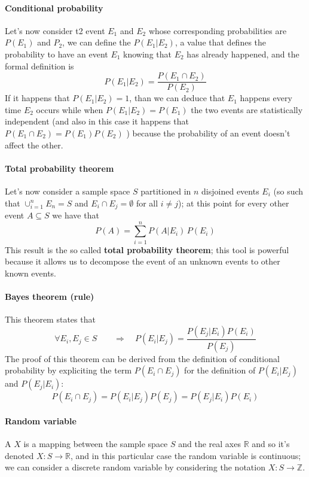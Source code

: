 	\paragraph{Conditional probability} Let's now consider t2 event $E_1$ and $E_2$ whose corresponding probabilities are $P(E_1)$ and $P_2$, we can define the  $P(E_1|E_2)$, a value that defines the probability to have an event $E_1$ knowing that $E_2$ has already happened, and the formal definition is
	\begin{equation}
		P(E_1|E_2) = \frac{P(E_1\cap E_2)}{P(E_2)}
	\end{equation}
	If it happens that $P(E_1|E_2) = 1$, than we can deduce that $E_1$ happens every time $E_2$ occurs while when $P(E_1|E_2) = P(E_1)$ the two events are statistically independent (and also in this case it happens that $P(E_1\cap E_2) = P(E_1)P(E_2)$ ) because the probability of an event doesn't affect the other.
	
	\paragraph{Total probability theorem} Let's now consider a sample space $S$ partitioned in $n$ disjoined events $E_i$ (so such that $\cup_{i=1}^n E_n = S$ and $E_i \cap E_j = \emptyset$ for all $i\neq j$); at this point for every other event $A\subseteq S$ we have that
	\[ P(A) = \sum_{i=1}^n P(A|E_i)\, P(E_i) \]
	This result is the so called \textbf{total probability theorem}; this tool is powerful because it allows us to decompose the event of an unknown events to other known events.
	
	\paragraph{Bayes theorem (rule)} This theorem states that
	\[\forall E_i,E_j \in S \qquad \Rightarrow \quad P(E_i | E_j) = \frac{P(E_j|E_i) P(E_i)}{P(E_j)}\]
	The proof of this theorem can be derived from the definition of conditional probability by expliciting the term $P(E_i\cap E_j)$ for the definition of $P(E_i|E_j)$ and $P(E_j|E_i)$:
	\[ P(E_i\cap E_j) = P(E_i|E_j) P(E_j) = P(E_j|E_i) P(E_i) \]
	
	
	\paragraph{Random variable} A  $X$ is a mapping between the sample space $S$ and the real axes $\mathds R$ and so it's denoted $X:S \rightarrow \mathds R$, and in this particular case the random variable is continuous; we can consider a discrete random variable by considering the notation $X: S \rightarrow \mathds Z$.
	
